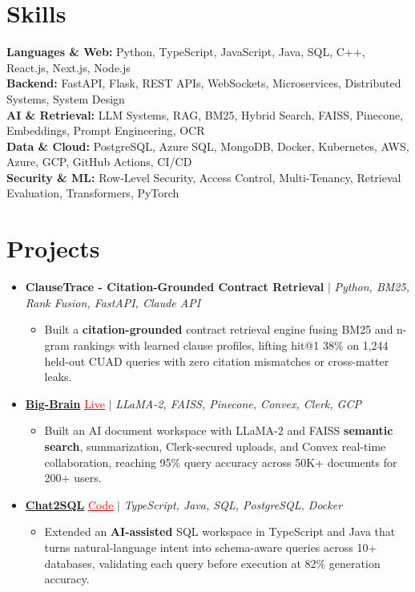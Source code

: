 \documentclass[letterpaper,10pt]{article}
\newcommand{\itemTail}{\vspace{-4pt}}
\newcommand{\sectionGap}{\vspace{-8pt}}
\newcommand{\projGap}{\vspace{3pt}}
\newcommand{\resumeItem}[1]{\item\small{{#1 \itemTail}}}
\newcommand{\resumeProjectHeading}[1]{\item \small #1 \vspace{-2pt}}
\newcommand{\resumeProjectLink}[2]{\href{#1}{\textcolor{red}{\underline{#2}}}}
\newcommand{\resumeSubHeadingListStart}{\begin{itemize}[leftmargin=0.0in, label={}]}
\newcommand{\resumeSubHeadingListEnd}{\end{itemize}}
\newcommand{\resumeProjItemListStart}{\begin{itemize}[leftmargin=0.15in,label=\textbullet,itemsep=3pt,topsep=0pt,parsep=0pt,partopsep=0pt]}
\newcommand{\resumeProjItemListEnd}{\end{itemize}\vspace{-4pt}}
\begin{document}
\section{Skills}
\begin{itemize}[leftmargin=0.15in, label={}]
\small{\item{
\textbf{Languages \& Web:} Python, TypeScript, JavaScript, Java, SQL, C++, React.js, Next.js, Node.js \\
\textbf{Backend:} FastAPI, Flask, REST APIs, WebSockets, Microservices, Distributed Systems, System Design \\
\textbf{AI \& Retrieval:} LLM Systems, RAG, BM25, Hybrid Search, FAISS, Pinecone, Embeddings, Prompt Engineering, OCR \\
\textbf{Data \& Cloud:} PostgreSQL, Azure SQL, MongoDB, Docker, Kubernetes, AWS, Azure, GCP, GitHub Actions, CI/CD \\
\textbf{Security \& ML:} Row-Level Security, Access Control, Multi-Tenancy, Retrieval Evaluation, Transformers, PyTorch
}}
\end{itemize}
\sectionGap
\section{Projects}
\resumeSubHeadingListStart
\vspace{3pt}
\resumeProjectHeading{\textbf{ClauseTrace - Citation-Grounded Contract Retrieval} $|$ \emph{Python, BM25, Rank Fusion, FastAPI, Claude API}}
\resumeProjItemListStart
\resumeItem{Built a \textbf{citation-grounded} contract retrieval engine fusing BM25 and n-gram rankings with learned clause profiles, lifting hit@1 38\% on 1,244 held-out CUAD queries with zero citation mismatches or cross-matter leaks.}
\resumeProjItemListEnd
\projGap
\resumeProjectHeading{\href{https://big-brain-pied.vercel.app/}{\textbf{Big-Brain}} \resumeProjectLink{https://big-brain-pied.vercel.app/}{Live} $|$ \emph{LLaMA-2, FAISS, Pinecone, Convex, Clerk, GCP}}
\resumeProjItemListStart
\resumeItem{Built an AI document workspace with LLaMA-2 and FAISS \textbf{semantic search}, summarization, Clerk-secured uploads, and Convex real-time collaboration, reaching 95\% query accuracy across 50K+ documents for 200+ users.}
\resumeProjItemListEnd
\projGap
\resumeProjectHeading{\href{https://github.com/SAHAJ-BHADJA/Chat2SQL}{\textbf{Chat2SQL}} \resumeProjectLink{https://github.com/SAHAJ-BHADJA/Chat2SQL}{Code} $|$ \emph{TypeScript, Java, SQL, PostgreSQL, Docker}}
\resumeProjItemListStart
\resumeItem{Extended an \textbf{AI-assisted} SQL workspace in TypeScript and Java that turns natural-language intent into schema-aware queries across 10+ databases, validating each query before execution at 82\% generation accuracy.}
\resumeProjItemListEnd
\resumeSubHeadingListEnd
\end{document}
